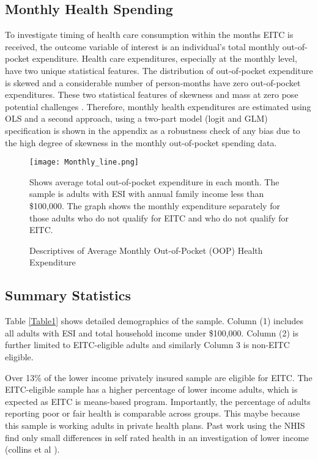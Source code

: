 \documentclass[smallcondensed,referee]{svjour3}
\begin{document}
\subsection{Monthly Health Spending}
To investigate timing of health care consumption within the  months EITC is received, the outcome variable of interest is an individual's total monthly out-of-pocket expenditure.  Health care expenditures, especially at the monthly level, have two unique statistical features. The distribution of out-of-pocket expenditure is skewed and a considerable number of person-months have zero out-of-pocket expenditures. These two statistical features of skewness and mass at zero pose potential challenges \citep{deb_modeling_2018, grafova_how_2020}. Therefore, monthly health expenditures are estimated using OLS and a second approach, using a two-part model (logit and GLM) specification is shown in the appendix as a robustness check of any bias due to the high degree of skewness in the monthly out-of-pocket spending data.
\begin{figure}
    \centering 
 \texttt{[image: Monthly\_line.png]} 
    \caption{Descriptives of Average Monthly Out-of-Pocket (OOP) Health Expenditure}\label{Fig2}
    	\begin{minipage}{15cm}
		\footnotesize
 Shows average total out-of-pocket expenditure in each month. The sample is adults with ESI with annual family income less than \$100,000.  The graph shows the monthly expenditure separately for those adults who do not qualify for EITC and who do not qualify for EITC.
 

	\end{minipage}
\end{figure}
\FloatBarrier




\FloatBarrier



\subsection{Summary Statistics}


Table \ref{Table1} shows detailed demographics of the sample. Column (1) includes all adults with ESI and total household income under \$100,000. Column (2) is further limited to EITC-eligible adults and similarly Column 3 is non-EITC eligible. 

Over 13\% of the lower income privately insured sample are eligible for EITC. The EITC-eligible sample has a higher percentage of lower income adults, which is expected as EITC is means-based program. Importantly, the percentage of adults reporting poor or fair health is comparable across groups. This maybe because this sample is working adults in private health plans. Past work using the NHIS find only small differences in self rated health in an investigation of lower income (collins et al ). 
\end{document}
